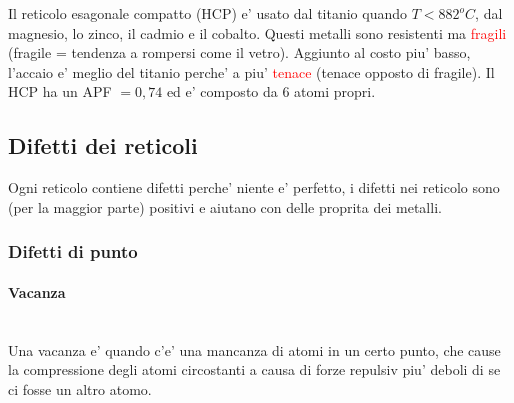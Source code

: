 \documentclass{article}
\begin{document}
            Il reticolo esagonale compatto (HCP) e' usato dal titanio quando $T<882^o C$, dal magnesio, lo zinco, il cadmio e il cobalto. 
            Questi metalli sono resistenti ma \textcolor{red}{fragili} (fragile = tendenza a rompersi come il vetro). Aggiunto al costo piu' basso, l'accaio e' meglio del titanio 
            perche' a piu' \textcolor{red}{tenace} (tenace opposto di fragile).
            \newline \newline Il HCP ha un APF $=0,74$ ed e' composto da 6 atomi propri.

        \subsection{Difetti dei reticoli}
        Ogni reticolo contiene difetti perche' niente e' perfetto, i difetti nei reticolo sono (per la maggior parte) positivi e aiutano con delle 
        proprita dei metalli.
            \subsubsection{Difetti di punto}
                \paragraph{Vacanza} \mbox{}\\
                Una vacanza e' quando c'e' una mancanza di atomi in un certo punto, che cause la compressione degli atomi circostanti a causa di forze repulsiv piu' 
                deboli di se ci fosse un altro atomo.
\end{document}
